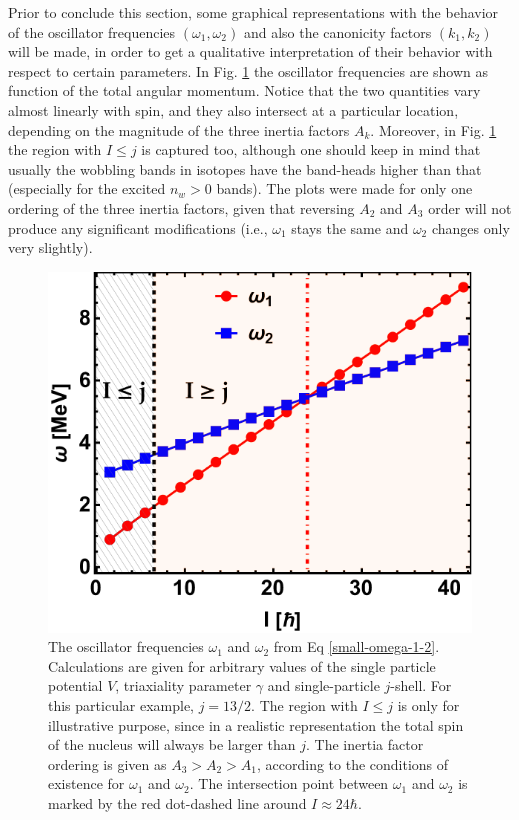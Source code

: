 Prior to conclude this section, some graphical representations with the behavior of the oscillator frequencies $(\omega_1,\omega_2)$ and also the canonicity factors $(k_1,k_2)$ will be made, in order to get a qualitative interpretation of their behavior with respect to certain parameters. In Fig. \ref{fig-omega1-omega2} the oscillator frequencies are shown as function of the total angular momentum. Notice that the two quantities vary almost linearly with spin, and they also intersect at a particular location, depending on the magnitude of the three inertia factors $A_k$. Moreover, in Fig. \ref{fig-omega1-omega2} the region with $I\leq j$ is captured too, although one should keep in mind that usually the wobbling bands in isotopes have the band-heads higher than that (especially for the excited $n_w>0$ bands). The plots were made for only one ordering of the three inertia factors, given that reversing $A_2$ and $A_3$ order will not produce any significant modifications (i.e., $\omega_1$ stays the same and $\omega_2$ changes only very slightly).
\begin{figure}
    \centering
    \includegraphics[scale=0.8]{Chapters/Figures/omega-1-2-frequencies-1.pdf}
    \caption{The oscillator frequencies $\omega_1$ and $\omega_2$ from Eq \ref{small-omega-1-2}. Calculations are given for arbitrary values of the single particle potential $V$, triaxiality parameter $\gamma$ and single-particle $j$-shell. For this particular example, $j=13/2$. The region with $I\leq j$ is only for illustrative purpose, since in a realistic representation the total spin of the nucleus will always be larger than $j$. The inertia factor ordering is given as $A_3>A_2>A_1$, according to the conditions of existence for $\omega_1$ and $\omega_2$. The intersection point between $\omega_1$ and $\omega_2$ is marked by the red dot-dashed line around $I\approx 24\hbar$.}
    \label{fig-omega1-omega2}
\end{figure}

